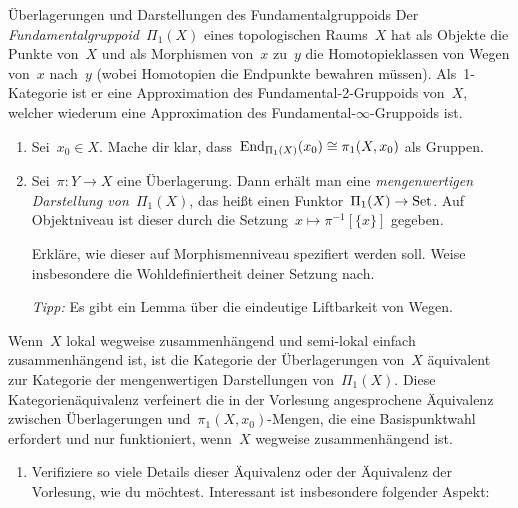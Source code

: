 \documentclass{uebblatt}
\begin{document}
\begin{aufgabe}{Überlagerungen und Darstellungen des Fundamentalgruppoids}
%
Der \emph{Fundamentalgruppoid}~$\Pi_1(X)$ eines topologischen Raums~$X$ hat als
Objekte die Punkte von~$X$ und als Morphismen von~$x$ zu~$y$ die Homotopieklassen
von Wegen von~$x$ nach~$y$ (wobei Homotopien die Endpunkte bewahren müssen).
Als~1-Kategorie ist er eine Approximation des Fundamental-2-Gruppoids von~$X$,
welcher wiederum eine Approximation des Fundamental-$\infty$-Gruppoids ist.
\begin{enumerate}
\item Sei~$x_0 \in X$. Mache dir klar, dass~$\mathrm{End}_{\Pi_1(X)}(x_0) \cong
\pi_1(X,x_0)$ als Gruppen.
\item Sei~$\pi : Y \to X$ eine Überlagerung. Dann erhält man eine
\emph{mengenwertigen Darstellung von~$\Pi_1(X)$}, das heißt einen
Funktor~$\Pi_1(X) \to \mathrm{Set}$. Auf Objektniveau ist dieser durch die Setzung~$x
\mapsto \pi^{-1}[\{x\}]$ gegeben.

Erkläre, wie dieser auf Morphismenniveau spezifiert werden soll. Weise
insbesondere die Wohldefiniertheit deiner Setzung nach.

\emph{Tipp:} Es gibt ein Lemma über die eindeutige Liftbarkeit von Wegen.
\end{enumerate}
Wenn~$X$ lokal wegweise zusammenhängend und semi-lokal einfach
zusammenhängend ist, ist die Kategorie der Überlagerungen von~$X$
äquivalent zur Kategorie der mengenwertigen Darstellungen
von~$\Pi_1(X)$. Diese Kategorienäquivalenz verfeinert die in der Vorlesung
angesprochene Äquivalenz zwischen Überlagerungen und~$\pi_1(X,x_0)$-Mengen, die
eine Basispunktwahl erfordert und nur funktioniert, wenn~$X$ wegweise
zusammenhängend ist.
\begin{enumerate}
\addtocounter{enumi}{2}
\item Verifiziere so viele Details dieser Äquivalenz oder der Äquivalenz der
Vorlesung, wie du möchtest. Interessant ist insbesondere folgender Aspekt:


\end{enumerate}
\end{aufgabe}
\end{document}
